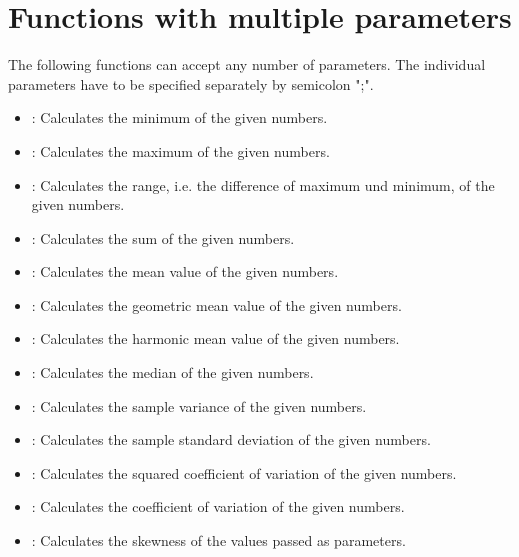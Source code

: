 \chapter{Functions with multiple parameters}

The following functions can accept any number of parameters.
The individual parameters have to be specified separately by semicolon ";".

\begin{itemize}

\item
{}:
Calculates the minimum of the given numbers.

\item
{}:
Calculates the maximum of the given numbers.

\item
{}:
Calculates the range, i.e. the difference of maximum und minimum, of the given numbers.

\item
{}:
Calculates the sum of the given numbers.

\item
{}:
Calculates the mean value of the given numbers.

\item
{}:
Calculates the geometric mean value of the given numbers.

\item
{}:
Calculates the harmonic mean value of the given numbers.

\item
{}:
Calculates the median of the given numbers.

\item
{}:
Calculates the sample variance of the given numbers.

\item
{}:
Calculates the sample standard deviation of the given numbers.

\item
{}:
Calculates the squared coefficient of variation of the given numbers.

\item
{}:
Calculates the coefficient of variation of the given numbers.

\item
{}:
Calculates the skewness of the values passed as parameters.


\end{itemize}
